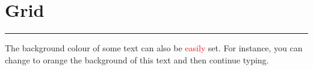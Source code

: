 \documentclass{report}
\begin{document}
\section*{}
\vspace{30pt}


\section*{Grid}


{\color{RubineRed} \rule{\linewidth}{0.5mm} }
 
The background colour of some text can also be \textcolor{red}{easily} set. For 
instance, you can change to orange the background of \colorbox{BurntOrange}{this 
text} and then continue typing.
\end{document}
